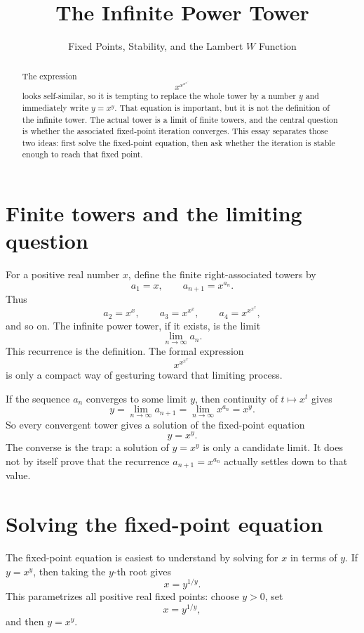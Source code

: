 \documentclass{essay}
\title{The Infinite Power Tower}
\subtitle{Fixed Points, Stability, and the Lambert \(W\) Function}
\author{}
\date{}
\begin{document}
\maketitle

\begin{abstract}
  \noindent The expression
  \[
    x^{x^{x^{x^{\cdots}}}}
  \]
  looks self-similar, so it is tempting to replace the whole tower by a
  number \(y\) and immediately write \(y=x^y\). That equation is important,
  but it is not the definition of the infinite tower. The actual tower is a
  limit of finite towers, and the central question is whether the associated
  fixed-point iteration converges. This essay separates those two ideas:
  first solve the fixed-point equation, then ask whether the iteration is
  stable enough to reach that fixed point.
\end{abstract}

\section{Finite towers and the limiting question}

For a positive real number \(x\), define the finite right-associated towers by
\[
  a_1=x,\qquad a_{n+1}=x^{a_n}.
\]
Thus
\[
  a_2=x^x,\qquad
  a_3=x^{x^x},\qquad
  a_4=x^{x^{x^x}},
\]
and so on. The infinite power tower, if it exists, is the limit
\[
  \lim_{n\to\infty} a_n.
\]
This recurrence is the definition. The formal expression
\[
  x^{x^{x^{x^{\cdots}}}}
\]
is only a compact way of gesturing toward that limiting process.

If the sequence \(a_n\) converges to some limit \(y\), then continuity of
\(t\mapsto x^t\) gives
\[
  y=\lim_{n\to\infty}a_{n+1}
   =\lim_{n\to\infty}x^{a_n}
   =x^y.
\]
So every convergent tower gives a solution of the fixed-point equation
\[
  y=x^y.
\]
The converse is the trap: a solution of \(y=x^y\) is only a candidate limit.
It does not by itself prove that the recurrence \(a_{n+1}=x^{a_n}\) actually
settles down to that value.

\section{Solving the fixed-point equation}

The fixed-point equation is easiest to understand by solving for \(x\) in
terms of \(y\). If \(y=x^y\), then taking the \(y\)-th root gives
\[
  x=y^{1/y}.
\]
This parametrizes all positive real fixed points: choose \(y>0\), set
\[
  x=y^{1/y},
\]
and then \(y=x^y\).
\end{document}

